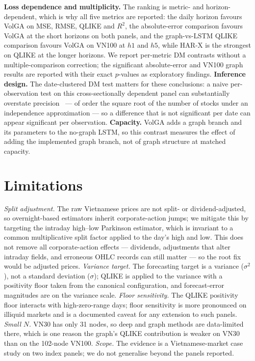 \documentclass[runningheads]{llncs}
\begin{document}
\textbf{Loss dependence and multiplicity.} The ranking is metric- and horizon-dependent, which is why
all five metrics are reported: the daily horizon favours VolGA on MSE, RMSE, QLIKE and $R^2$, the
absolute-error comparison favours VolGA at the short horizons on both panels, and the graph-vs-LSTM
QLIKE comparison favours VolGA on VN100 at $h1$ and $h5$, while HAR-X is the strongest on QLIKE at the
longer horizons. We report per-metric DM contrasts without a multiple-comparison correction; the
significant absolute-error and VN100 graph results are reported with their exact $p$-values as
exploratory findings. \textbf{Inference design.} The
date-clustered DM test matters for these conclusions: a naive per-observation test on this
cross-sectionally dependent panel can substantially overstate precision~\cite{petersen2009} --- of
order the square root of the number of stocks under an independence approximation --- so a difference
that is not significant per date can appear significant per observation.
\textbf{Capacity.} VolGA adds a graph branch and its parameters to the no-graph LSTM, so this contrast
measures the effect of adding the implemented graph branch, not of graph structure at matched capacity.

\section{Limitations}
\emph{Split adjustment.} The raw Vietnamese prices are not split- or dividend-adjusted, so
overnight-based estimators inherit corporate-action jumps; we mitigate this by targeting the intraday
high--low Parkinson estimator, which is invariant to a common multiplicative split factor applied to
the day's high and low. This does not remove all corporate-action effects --- dividends, adjustments
that alter intraday fields, and erroneous OHLC records can still matter --- so the root fix would be
adjusted prices.
\emph{Variance target.} The forecasting target is a variance ($\sigma^2$), not a standard deviation
($\sigma$); QLIKE is applied to the variance with a positivity floor taken from the canonical
configuration, and forecast-error magnitudes are on the variance scale. \emph{Floor sensitivity.} The
QLIKE positivity floor interacts with high-zero-range days; floor sensitivity is more pronounced on
illiquid markets and is a documented caveat for any extension to such panels. \emph{Small $N$.} VN30
has only 31 nodes, so deep and graph methods are data-limited there, which is one reason the graph's
QLIKE contribution is weaker on VN30 than on the 102-node VN100. \emph{Scope.} The evidence is a
Vietnamese-market case study on two index panels; we do not generalise beyond the panels reported.
\end{document}
